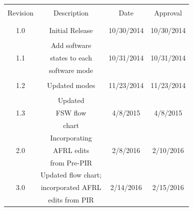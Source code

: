 \documentclass{article}
\begin{document}
\vspace{0.5in}
\begin{center}
\begin{tabular}{|c|c|c|c|}
    \hline
              &                   &              &            \\
    Revision  &  Description      &  Date        &  Approval  \\
              &                   &              &            \\ \hline
              &                   &              &            \\
    1.0       &  Initial Release  &  10/30/2014    &  10/30/2014  \\
              &                   	&              &            \\ \hline
              &       Add software            &              &            \\
    1.1       &     states to each   &  10/31/2014   &  10/31/2014 \\
              &        software mode           &              &            \\ \hline
              &                   &              &            \\
    1.2       &  Updated modes        &  11/23/2014  &  11/23/2014       \\
              &                   &              &            \\ \hline
              &       Updated            &              &            \\
    1.3       &       FSW flow         &  4/8/2015    &  4/8/2015       \\
              &        chart           &              &            \\ \hline
              &      Incorporating          &              &            \\
    2.0       &     AFRL edits           &  2/8/2016    &  2/10/2016       \\
              &     from Pre-PIR            &              &            \\ \hline
              &     Updated flow chart;          &              &            \\
	3.0       &     incorporated AFRL       &  2/14/2016    &  2/15/2016       \\
              &     edits from PIR         &              &            \\ \hline
\end{tabular}
\end{center}
\end{document}
